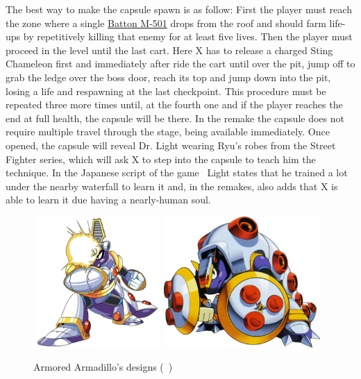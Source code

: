The best way to make the capsule spawn is as follow: First the player must reach the zone where a single \hyperlink{enem:Batton_M-501}{Batton M-501} drops from the roof  and should farm life-ups by repetitively killing that enemy for at least five lives. Then the player must proceed in the level until the last cart. Here X has to release a charged Sting Chameleon first and immediately after ride the cart until over the pit, jump off to grab the ledge over the boss door, reach its top and jump down into the pit, losing a life and respawning at the last checkpoint. This procedure must be  repeated three more times until, at the  fourth one and if the player reaches the end at full health, the capsule will be there. In the remake the capsule does not require multiple travel through the stage, being available immediately. Once opened, the capsule will reveal Dr. Light wearing Ryu's robes from the Street Fighter series, which will ask X to step into the capsule to teach him the technique. In the Japanese  script of the game~\cite{wordpress:X_japanese_script} Light states that he trained a lot under the nearby waterfall to learn it and, in the remakes, also adds that X is able to learn it due having a nearly-human soul.
\begin{figure}[htp]
	\centering
	\includegraphics[height=5cm]{figures/X1/Armored_armadillo/Armored_armadillo.jpg}
	\includegraphics[height=5cm]{figures/X1/Armored_armadillo/MHXArmoredArmadillo.png}
	\caption{Armored Armadillo's designs (~\cite{book:MMX_Complete_art})}
\end{figure}
